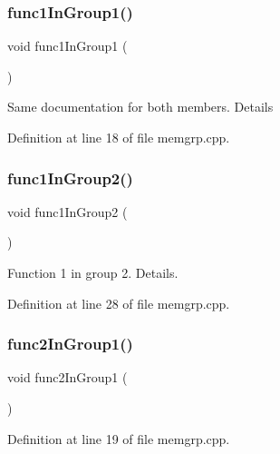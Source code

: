 \subsubsection{\texorpdfstring{func1\+In\+Group1()}{func1InGroup1()}}
{\footnotesize\ttfamily void func1\+In\+Group1 (\begin{DoxyParamCaption}{ }\end{DoxyParamCaption})}

Same documentation for both members. Details 

Definition at line 18 of file memgrp.\+cpp.

\mbox{\label{class_memgrp___test_a830fbb771817008ac58a211d63b4149a}} 
\subsubsection{\texorpdfstring{func1\+In\+Group2()}{func1InGroup2()}}
{\footnotesize\ttfamily void func1\+In\+Group2 (\begin{DoxyParamCaption}{ }\end{DoxyParamCaption})}

Function 1 in group 2. Details. 

Definition at line 28 of file memgrp.\+cpp.

\mbox{\label{class_memgrp___test_a1c88d8c249f4fc6bf63b2f7b5b2e9130}} 
\subsubsection{\texorpdfstring{func2\+In\+Group1()}{func2InGroup1()}}
{\footnotesize\ttfamily void func2\+In\+Group1 (\begin{DoxyParamCaption}{ }\end{DoxyParamCaption})}



Definition at line 19 of file memgrp.\+cpp.

\mbox{\label{class_memgrp___test_ac8edb233ae7671a1c0280604440f482e}} 
